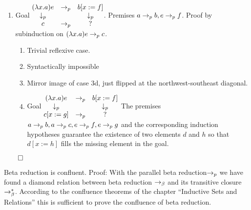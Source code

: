 \begin{theorem}
\begin{enumerate}
  \item
    Goal $\begin{matrix} (\lambda x.a) e & \to_p & b[x:=f] \\ \downarrow_p & & \downarrow_p \\ c & \to_p & ? \end{matrix}$. Premises $a \to_{p} b, e \to_{p} f$.
    Proof by subinduction on $(\lambda x.a) e \to_{p} c$.
    \begin{enumerate}
    \item Trivial reflexive case.
    \item Syntactically impossible
    \item Mirror image of case 3d, just flipped at the northwest-southeast diagonal.
    \item
      Goal $\begin{matrix} (\lambda x.a) e & \to_p & b[x:=f] \\ \downarrow_p & & \downarrow_p \\ c[x:=g] & \to_p & ? \end{matrix}$
      The premises $a \to_{p} b, a \to_{p} c, e \to_{p} f, e \to_{p} g$
      and the corresponding induction hypotheses guarantee the existence of
      two elements $d$ and $h$ so that $d[x:=h]$ fills the missing element
      in the goal.
    \end{enumerate}

  \end{enumerate}
  $\qed$
\end{theorem}


\begin{theorem}
  Beta reduction is confluent.
  Proof: With the parallel beta reduction$\to_{p}$ we have found a diamond
  relation between beta reduction $\to_\beta$ and its transitive closure
  $\to^*_\beta$. According to the confluence theorems of the chapter
  ``Inductive Sets and Relations'' this is sufficient to prove the confluence
  of beta reduction.
\end{theorem}
